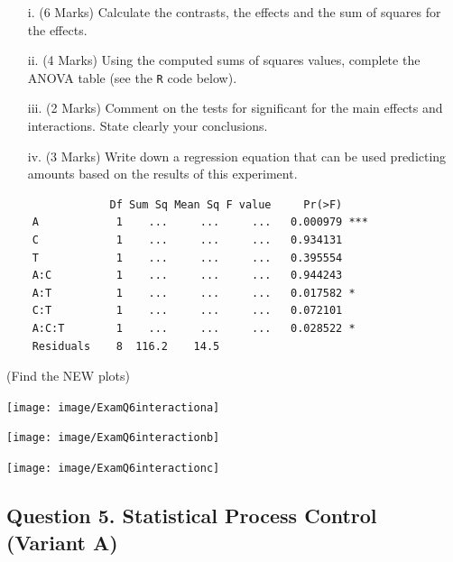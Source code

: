 \documentclass[a4paper,12pt]{article}
\begin{document}
\newpage


\begin{itemize}
	\item[i.] (6 Marks) Calculate the contrasts, the effects and the sum of squares for the effects.
	\item[ii.] (4 Marks) Using the computed sums of squares values, complete the ANOVA table (see the \texttt{R} code below).
	\item[iii.] (2 Marks) Comment on the tests for significant for the main effects and interactions. State clearly your conclusions.
	\item[iv.] (3 Marks) Write down a  regression equation that can be used predicting amounts based on the results of this experiment.
\end{itemize}

{
\large
\begin{framed}
	\begin{verbatim}
	            Df Sum Sq Mean Sq F value     Pr(>F)    
	A            1    ...     ...     ...   0.000979 ***
	C            1    ...     ...     ...   0.934131    
	T            1    ...     ...     ...   0.395554 
	A:C          1    ...     ...     ...   0.944243    
	A:T          1    ...     ...     ...   0.017582 *
	C:T          1    ...     ...     ...   0.072101
	A:C:T        1    ...     ...     ...   0.028522 *    
	Residuals    8  116.2    14.5                      
	\end{verbatim}
\end{framed}
}

\newpage
(Find the NEW plots)
\begin{center}
	\texttt{[image: image/ExamQ6interactiona]}
\end{center}
\begin{center}
	\texttt{[image: image/ExamQ6interactionb]}
\end{center}
\begin{center}
	\texttt{[image: image/ExamQ6interactionc]}
\end{center}
\newpage
\subsection*{Question 5. Statistical Process Control (Variant A) }
\end{document}
